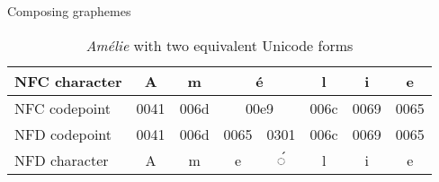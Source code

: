 \documentclass[../index.tex]{subfiles}
\begin{document}
\renewcommand{\currenttitle}{Composing graphemes}
\begin{frame}{\currenttitle}
%
%
%
%
%
%
%
  \begin{table}
    \footnotesize
    \begin{tabular}{|l||c|c|c|c|c|c|c|} \hline
      NFC character & A     & m     & \multicolumn{2}{c|}{é}     & l     & i     & e \\ \hline
      NFC codepoint & 0041  & 006d  & \multicolumn{2}{c|}{00e9}  & 006c  & 0069  & 0065 \\ \hline
      NFD codepoint & 0041  & 006d  & 0065        & 0301        & 006c  & 0069  & 0065 \\ \hline
      NFD character & A     & m     & e           & ◌́           & l     & i     & e \\ \hline
    \end{tabular}
    \caption{\textit{Amélie} with two equivalent Unicode forms}
  \end{table}
\end{frame}
\end{document}
